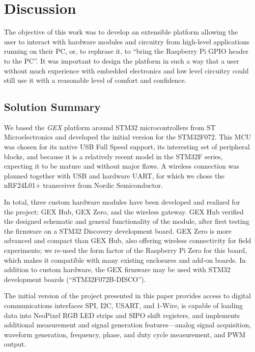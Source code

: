 \chapter{Discussion}

The objective of this work was to develop an extensible platform allowing the user to interact with hardware modules and circuitry from high-level applications running on their \gls{PC}, or, to rephrase it, to ``bring the Raspberry Pi GPIO header to the \gls{PC}''. It was important to design the platform in such a way that a user without much experience with embedded electronics and low level circuitry could still use it with a reasonable level of comfort and confidence.

\section{Solution Summary}

We based the \textit{GEX} platform around STM32 microcontrollers from ST Microelectronics and developed the initial version for the STM32F072. This \gls{MCU} was chosen for its native \gls{USB} Full Speed support, its interesting set of peripheral blocks, and because it is a relatively recent model in the STM32F series, expecting it to be mature and without major flaws. A wireless connection was planned together with \gls{USB} and hardware \gls{UART}, for which we chose the nRF24L01+ transceiver from Nordic Semiconductor.

In total, three custom hardware modules have been developed and realized for the project: GEX Hub, GEX Zero, and the wireless gateway. GEX Hub verified the designed schematic and general functionality of the module, after first testing the firmware on a STM32 Discovery development board. GEX Zero is more advanced and compact than GEX Hub, also offering wireless connectivity for field experiments; we re-used the form factor of the Raspberry Pi Zero for this board, which makes it compatible with many existing enclosures and add-on boards. In addition to custom hardware, the GEX firmware may be used with STM32 development boards (``STM32F072B-DISCO'').

The initial version of the project presented in this paper provides access to digital communications interfaces \gls{SPI}, \gls{I2C}, \gls{USART}, and 1-Wire, is capable of loading data into NeoPixel RGB \gls{LED} strips and \gls{SIPO} shift registers, and implements additional measurement and signal generation features---analog signal acquisition, waveform generation, frequency, phase, and duty cycle measurement, and \gls{PWM} output.

